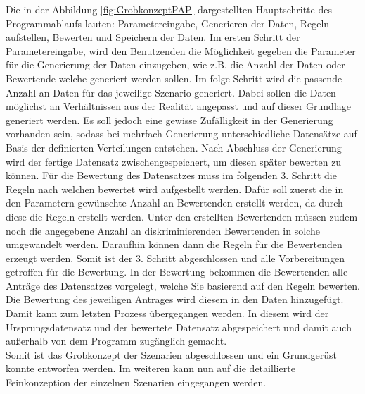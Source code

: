\begin{onehalfspace}
Die in der Abbildung \ref{fig:GrobkonzeptPAP} dargestellten Hauptschritte des Programmablaufs lauten: Parametereingabe, Generieren der Daten, Regeln aufstellen, Bewerten und Speichern der Daten. Im ersten Schritt der Parametereingabe, wird den Benutzenden die Möglichkeit gegeben die Parameter für die Generierung der Daten einzugeben, wie z.B. die Anzahl der Daten oder Bewertende welche generiert werden sollen. Im folge Schritt wird die passende Anzahl an Daten für das jeweilige Szenario generiert. Dabei sollen die Daten möglichst an Verhältnissen aus der Realität angepasst und auf dieser Grundlage generiert werden. Es soll jedoch eine gewisse Zufälligkeit in der Generierung vorhanden sein, sodass bei mehrfach Generierung unterschiedliche Datensätze auf Basis der definierten Verteilungen entstehen. Nach Abschluss der Generierung wird der fertige Datensatz zwischengespeichert, um diesen später bewerten zu können. Für die Bewertung des Datensatzes muss im folgenden 3. Schritt die Regeln nach welchen bewertet wird aufgestellt werden. Dafür soll zuerst die in den Parametern gewünschte Anzahl an Bewertenden erstellt werden, da durch diese die Regeln erstellt werden. Unter den erstellten Bewertenden müssen zudem noch die angegebene Anzahl an diskriminierenden Bewertenden in solche umgewandelt werden. Daraufhin können dann die Regeln für die Bewertenden erzeugt werden. Somit ist der 3. Schritt abgeschlossen und alle Vorbereitungen getroffen für die Bewertung. In der Bewertung bekommen die Bewertenden alle Anträge des Datensatzes vorgelegt, welche Sie basierend auf den Regeln bewerten. Die Bewertung des jeweiligen Antrages wird diesem in den Daten hinzugefügt. Damit kann zum letzten Prozess übergegangen werden. In diesem wird der Ursprungsdatensatz und der bewertete Datensatz abgespeichert und damit auch au{\ss}erhalb von dem Programm zugänglich gemacht.\\
Somit ist das Grobkonzept der Szenarien abgeschlossen und ein Grundgerüst konnte entworfen werden. Im weiteren kann nun auf die detaillierte Feinkonzeption der einzelnen Szenarien eingegangen werden.

\end{onehalfspace}
